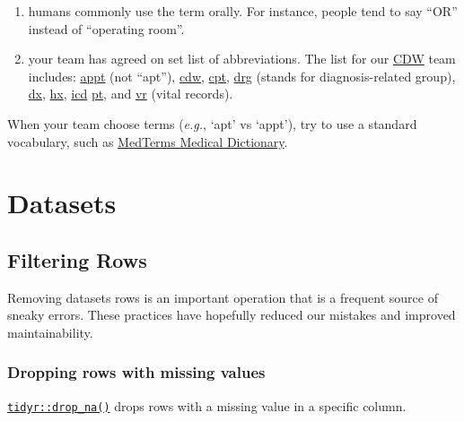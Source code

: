 \documentclass[
]{book}
\begin{document}
\begin{enumerate}
\def\labelenumi{\arabic{enumi}.}
\item
  humans commonly use the term orally. For instance, people tend to say ``OR'' instead of ``operating room''.
\item
  your team has agreed on set list of abbreviations. The list for our \href{https://github.com/OuhscBbmc/prairie-outpost-public\#readme}{CDW} team includes:
  \href{https://www.merriam-webster.com/dictionary/appointment}{appt} (not ``apt''),
  \href{https://en.wikipedia.org/wiki/Clinical_data_repository}{cdw},
  \href{https://en.wikipedia.org/wiki/Current_Procedural_Terminology}{cpt},
  \href{https://en.wikipedia.org/wiki/Diagnosis-related_group}{drg} (stands for diagnosis-related group),
  \href{https://www.medicinenet.com/script/main/art.asp?articlekey=33829}{dx},
  \href{https://medical-dictionary.thefreedictionary.com/Hx}{hx},
  \href{https://www.cdc.gov/nchs/icd/icd10cm.htm}{icd}
  \href{https://www.medicinenet.com/script/main/art.asp?articlekey=39154}{pt}, and
  \href{https://www.ok.gov/health/Birth_and_Death_Certificates/}{vr} (vital records).
\end{enumerate}

When your team choose terms (\emph{e.g.}, `apt' vs `appt'), try to use a standard vocabulary, such as \href{https://www.medicinenet.com/medterms-medical-dictionary/article.htm}{MedTerms Medical Dictionary}.

\hypertarget{datasets}{%
\section{Datasets}\label{datasets}}

\hypertarget{style-filter}{%
\subsection{Filtering Rows}\label{style-filter}}

Removing datasets rows is an important operation that is a frequent source of sneaky errors. These practices have hopefully reduced our mistakes and improved maintainability.

\hypertarget{style-filter-drop_na}{%
\subsubsection{Dropping rows with missing values}\label{style-filter-drop_na}}

\href{https://tidyr.tidyverse.org/reference/drop_na.html}{\texttt{tidyr::drop\_na()}} drops rows with a missing value in a specific column.
\end{document}
